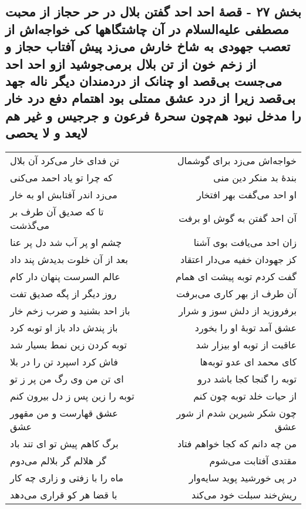 \begin{center}
\section*{بخش ۲۷ - قصهٔ احد احد گفتن بلال در حر حجاز از محبت مصطفی علیه‌السلام در آن چاشتگاهها کی خواجه‌اش از تعصب جهودی به شاخ خارش می‌زد پیش آفتاب حجاز و از زخم خون از تن بلال برمی‌جوشید ازو احد احد می‌جست بی‌قصد او چنانک از دردمندان دیگر ناله جهد بی‌قصد زیرا از درد عشق ممتلی بود اهتمام دفع درد خار را مدخل نبود هم‌چون سحرهٔ فرعون و جرجیس و غیر هم لایعد و لا یحصی}
\label{sec:sh027}
\begin{longtable}{l p{0.5cm} r}
تن فدای خار می‌کرد آن بلال
&&
خواجه‌اش می‌زد برای گوشمال
\\
که چرا تو یاد احمد می‌کنی
&&
بندهٔ بد منکر دین منی
\\
می‌زد اندر آفتابش او به خار
&&
او احد می‌گفت بهر افتخار
\\
تا که صدیق آن طرف بر می‌گذشت
&&
آن احد گفتن به گوش او برفت
\\
چشم او پر آب شد دل پر عنا
&&
زان احد می‌یافت بوی آشنا
\\
بعد از آن خلوت بدیدش پند داد
&&
کز جهودان خفیه می‌دار اعتقاد
\\
عالم السرست پنهان دار کام
&&
گفت کردم توبه پیشت ای همام
\\
روز دیگر از پگه صدیق تفت
&&
آن طرف از بهر کاری می‌برفت
\\
باز احد بشنید و ضرب زخم خار
&&
برفروزید از دلش سوز و شرار
\\
باز پندش داد باز او توبه کرد
&&
عشق آمد توبهٔ او را بخورد
\\
توبه کردن زین نمط بسیار شد
&&
عاقبت از توبه او بیزار شد
\\
فاش کرد اسپرد تن را در بلا
&&
کای محمد ای عدو توبه‌ها
\\
ای تن من وی رگ من پر ز تو
&&
توبه را گنجا کجا باشد درو
\\
توبه را زین پس ز دل بیرون کنم
&&
از حیات خلد توبه چون کنم
\\
عشق قهارست و من مقهور عشق
&&
چون شکر شیرین شدم از شور عشق
\\
برگ کاهم پیش تو ای تند باد
&&
من چه دانم که کجا خواهم فتاد
\\
گر هلالم گر بلالم می‌دوم
&&
مقتدی آفتابت می‌شوم
\\
ماه را با زفتی و زاری چه کار
&&
در پی خورشید پوید سایه‌وار
\\
با قضا هر کو قراری می‌دهد
&&
ریش‌خند سبلت خود می‌کند
\\

\end{longtable}
\end{center}
